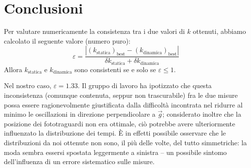 \documentclass{article}
\begin{document}
\section{Conclusioni}
Per valutare numericamente la consistenza tra i due valori di $k$ ottenuti,
abbiamo calcolato il seguente valore (numero puro):
\[
    \varepsilon =
    \frac{
        \left|\left(k_\text{statica}\right)_\text{best} - \left(k_\text{dinamica}\right)_\text{best}\right|
    }{
        \delta k_\text{statica} + \delta k_\text{dinamica}
    }
\]
Allora $k_\text{statica}$ e $k_\text{dinamica}$ sono consistenti se e solo se $\varepsilon \le 1$.

Nel nostro caso, $\varepsilon = 1.33$. Il gruppo di lavoro ha ipotizzato che
questa inconsistenza (comunque contenuta, seppur non trascurabile) fra le due
misure possa essere ragionevolmente giustificata dalla difficoltà incontrata
nel ridurre al minimo le oscillazioni in direzione perpendicolare a $\vec{g}$;
considerato inoltre che la posizione dei fototraguardi non era ottimale, ciò
potrebbe avere ulteriormente influenzato la distribuzione dei tempi. È in
effetti possibile osservare che le distribuzioni da noi ottenute non sono,
il più delle volte, del tutto simmetriche: la moda sembra essersi spostata
leggermente a sinistra – un possibile sintomo dell'influenza di un
errore sistematico sulle misure.
\end{document}

